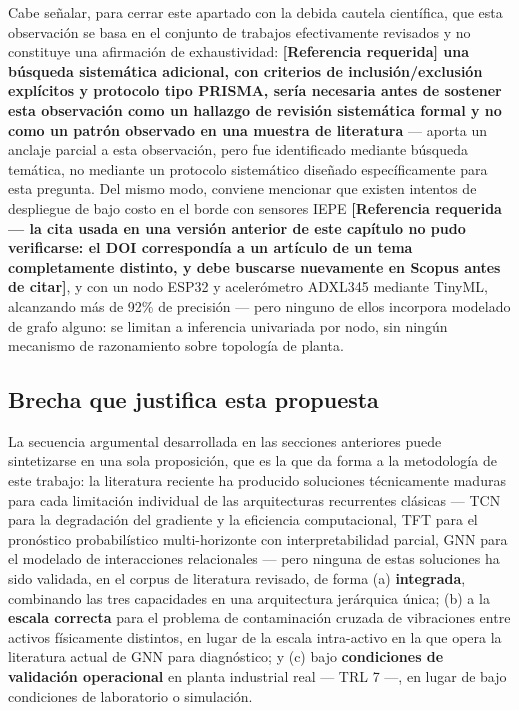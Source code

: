 \documentclass[11pt]{article}
\begin{document}
Cabe señalar, para cerrar este apartado con la debida cautela científica, que esta observación se basa en el conjunto de trabajos efectivamente revisados y no constituye una afirmación de exhaustividad: \textbf{[Referencia requerida] una búsqueda sistemática adicional, con criterios de inclusión/exclusión explícitos y protocolo tipo PRISMA, sería necesaria antes de sostener esta observación como un hallazgo de revisión sistemática formal y no como un patrón observado en una muestra de literatura} --- \citet{li2022gnnbenchmark} aporta un anclaje parcial a esta observación, pero fue identificado mediante búsqueda temática, no mediante un protocolo sistemático diseñado específicamente para esta pregunta. Del mismo modo, conviene mencionar que existen intentos de despliegue de bajo costo en el borde con sensores IEPE \textbf{[Referencia requerida --- la cita usada en una versión anterior de este capítulo no pudo verificarse: el DOI correspondía a un artículo de un tema completamente distinto, y debe buscarse nuevamente en Scopus antes de citar]}, y \citet{researchgate2025} con un nodo ESP32 y acelerómetro ADXL345 mediante TinyML, alcanzando más de 92\% de precisión --- pero ninguno de ellos incorpora modelado de grafo alguno: se limitan a inferencia univariada por nodo, sin ningún mecanismo de razonamiento sobre topología de planta.

\subsection{Brecha que justifica esta propuesta}
\label{sec:brecha}

La secuencia argumental desarrollada en las secciones anteriores puede sintetizarse en una sola proposición, que es la que da forma a la metodología de este trabajo: la literatura reciente ha producido soluciones técnicamente maduras para cada limitación individual de las arquitecturas recurrentes clásicas --- TCN para la degradación del gradiente y la eficiencia computacional, TFT para el pronóstico probabilístico multi-horizonte con interpretabilidad parcial, GNN para el modelado de interacciones relacionales --- pero ninguna de estas soluciones ha sido validada, en el corpus de literatura revisado, de forma (a) \textbf{integrada}, combinando las tres capacidades en una arquitectura jerárquica única; (b) a la \textbf{escala correcta} para el problema de contaminación cruzada de vibraciones entre activos físicamente distintos, en lugar de la escala intra-activo en la que opera la literatura actual de GNN para diagnóstico; y (c) bajo \textbf{condiciones de validación operacional} en planta industrial real --- TRL 7 ---, en lugar de bajo condiciones de laboratorio o simulación.
\end{document}

